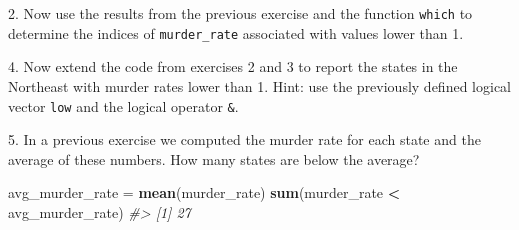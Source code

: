 \documentclass[
]{krantz}
\newenvironment{Shaded}{\begin{snugshade}}{\end{snugshade}}
\newcommand{\CommentTok}[1]{\textcolor[rgb]{0.37,0.37,0.37}{\textit{#1}}}
\newcommand{\DataTypeTok}[1]{\textcolor[rgb]{0.27,0.27,0.27}{#1}}
\newcommand{\DecValTok}[1]{\textcolor[rgb]{0.06,0.06,0.06}{#1}}
\newcommand{\KeywordTok}[1]{\textcolor[rgb]{0.27,0.27,0.27}{\textbf{#1}}}
\newcommand{\NormalTok}[1]{#1}
\newcommand{\OperatorTok}[1]{\textcolor[rgb]{0.43,0.43,0.43}{\textbf{#1}}}
\newcommand{\StringTok}[1]{\textcolor[rgb]{0.5,0.5,0.5}{#1}}
\begin{document}
2. Now use the results from the previous exercise and the function \texttt{which} to determine the indices of \texttt{murder\_rate} associated with values lower than 1.

\begin{Shaded}
\end{Shaded}

4. Now extend the code from exercises 2 and 3 to report the states in the Northeast with murder rates lower than 1. Hint: use the previously defined logical vector \texttt{low} and the logical operator \texttt{\&}.

\begin{Shaded}
\end{Shaded}

5. In a previous exercise we computed the murder rate for each state and the average of these numbers. How many states are below the average?

\begin{Shaded}
\begin{Highlighting}[]
\NormalTok{avg_murder_rate =}\StringTok{ }\KeywordTok{mean}\NormalTok{(murder_rate)}
\KeywordTok{sum}\NormalTok{(murder_rate }\OperatorTok{<}\StringTok{ }\NormalTok{avg_murder_rate)}
\CommentTok{#> [1] 27}
\end{Highlighting}
\end{Shaded}
\end{document}
